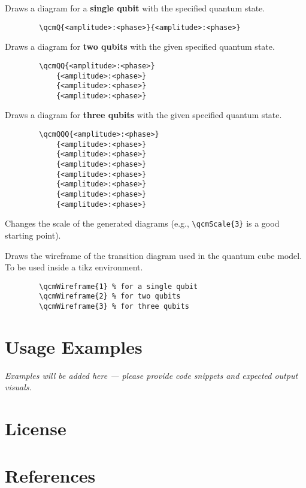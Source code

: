 \documentclass{article}
\begin{document}
\begin{description}
    \item Draws a diagram for a \textbf{single qubit} with the specified quantum state.
    \begin{verbatim}
        \qcmQ{<amplitude>:<phase>}{<amplitude>:<phase>}
    \end{verbatim}

    \item Draws a diagram for \textbf{two qubits} with the given specified quantum state.
    \begin{verbatim}
        \qcmQQ{<amplitude>:<phase>}
            {<amplitude>:<phase>}
            {<amplitude>:<phase>}
            {<amplitude>:<phase>}
    \end{verbatim}

    \item  Draws a diagram for \textbf{three qubits} with the given specified quantum state.
    \begin{verbatim}
        \qcmQQQ{<amplitude>:<phase>}
            {<amplitude>:<phase>}
            {<amplitude>:<phase>}
            {<amplitude>:<phase>}
            {<amplitude>:<phase>}
            {<amplitude>:<phase>}
            {<amplitude>:<phase>}
            {<amplitude>:<phase>}
    \end{verbatim}

  
    \item Changes the scale of the generated diagrams (e.g., \verb|\qcmScale{3}| is a good starting point).
  
    \item Draws the wireframe of the transition diagram used in the quantum cube model.
        To be used inside a tikz environment.
    \begin{verbatim}
        \qcmWireframe{1} % for a single qubit
        \qcmWireframe{2} % for two qubits
        \qcmWireframe{3} % for three qubits
    \end{verbatim}
\end{description}

\section*{Usage Examples}

\textit{Examples will be added here — please provide code snippets and expected output visuals.}

\section*{License}


\section*{References}

\end{document}
